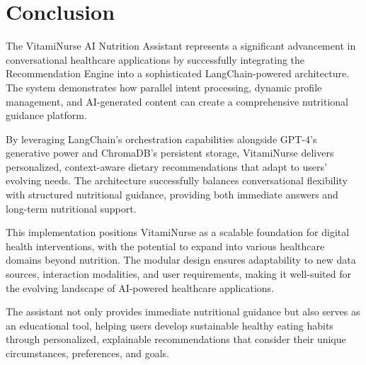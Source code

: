 \section{Conclusion}
The VitamiNurse AI Nutrition Assistant represents a significant advancement in conversational healthcare applications by successfully integrating the Recommendation Engine into a sophisticated LangChain-powered architecture. The system demonstrates how parallel intent processing, dynamic profile management, and AI-generated content can create a comprehensive nutritional guidance platform.

By leveraging LangChain's orchestration capabilities alongside GPT-4's generative power and ChromaDB's persistent storage, VitamiNurse delivers personalized, context-aware dietary recommendations that adapt to users' evolving needs. The architecture successfully balances conversational flexibility with structured nutritional guidance, providing both immediate answers and long-term nutritional support.

This implementation positions VitamiNurse as a scalable foundation for digital health interventions, with the potential to expand into various healthcare domains beyond nutrition. The modular design ensures adaptability to new data sources, interaction modalities, and user requirements, making it well-suited for the evolving landscape of AI-powered healthcare applications.

The assistant not only provides immediate nutritional guidance but also serves as an educational tool, helping users develop sustainable healthy eating habits through personalized, explainable recommendations that consider their unique circumstances, preferences, and goals.


